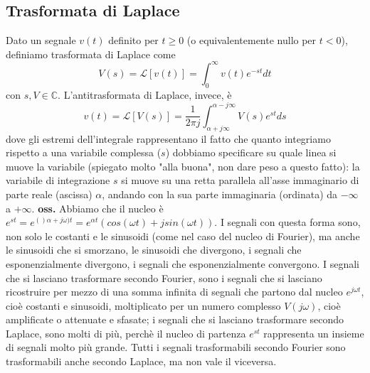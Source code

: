 \subsection{Trasformata di Laplace}
Dato un segnale $v(t)$ definito per $t\geq 0$ (o equivalentemente nullo per $t < 0$), definiamo trasformata di Laplace come
\[
    V(s) = \mathcal{L}[v(t)] = \int_{0}^{\infty} v(t) e^{-st}dt
\]
con $s,V \in \mathbb{C}$.\newline
L'antitrasformata di Laplace, invece, è
\[
    v(t) = \mathcal{L}[V(s)] = \frac{1}{2\pi j} \int_{\alpha + j \infty}^{\alpha - j \infty} V(s) e^{st}ds
\]
dove gli estremi dell'integrale rappresentano il fatto che quanto integriamo rispetto a una variabile complessa ($s$) dobbiamo specificare su quale linea si muove la variabile (spiegato molto "alla buona", non dare peso a questo fatto): la variabile di integrazione $s$ si muove su una retta parallela all'asse immaginario di parte reale (ascissa) $\alpha$, andando con la sua parte immaginaria (ordinata) da $- \infty$ a $+ \infty$.\newline
\textbf{oss.} Abbiamo che il nucleo è $e^{st} = e^{()\alpha + j \omega) t} = e^{\alpha t} (cos(\omega t) + j sin(\omega t))$. I segnali con questa forma sono, non solo le costanti e le sinusoidi (come nel caso del nucleo di Fourier), ma anche le sinusoidi che si smorzano, le sinusoidi che divergono, i segnali che esponenzialmente divergono, i segnali che esponenzialmente convergono. I segnali che si lasciano trasformare secondo Fourier, sono i segnali che si lasciano ricostruire per mezzo di una somma infinita di segnali che partono dal nucleo $e^{j \omega t}$, cioè costanti e sinusoidi, moltiplicato per un numero complesso $V(j \omega)$, cioè amplificate o attenuate e sfasate; i segnali che si lasciano trasformare secondo Laplace, sono molti di più, perchè il nucleo di partenza $e^{st}$ rappresenta un insieme di segnali molto più grande. Tutti i segnali trasformabili secondo Fourier sono trasformabili anche secondo Laplace, ma non vale il viceversa.
